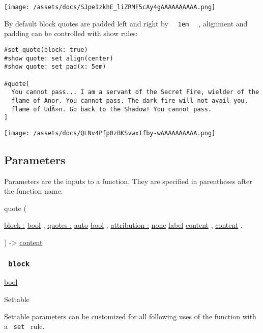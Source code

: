 \texttt{[image: /assets/docs/SJpe1zkhE\_liZRMF5cAy4gAAAAAAAAAA.png]}

By default block quotes are padded left and right by
\texttt{\ }{\texttt{\ 1em\ }}\texttt{\ } , alignment and padding can be
controlled with show rules:

\begin{verbatim}
#set quote(block: true)
#show quote: set align(center)
#show quote: set pad(x: 5em)

#quote[
  You cannot pass... I am a servant of the Secret Fire, wielder of the
  flame of Anor. You cannot pass. The dark fire will not avail you,
  flame of UdÃ»n. Go back to the Shadow! You cannot pass.
]
\end{verbatim}

\texttt{[image: /assets/docs/QLNv4Pfp0zBKSvwxIfby-wAAAAAAAAAA.png]}

\subsection{\texorpdfstring{{ Parameters
}}{ Parameters }}\label{parameters}

\label{parameters-tooltip}
Parameters are the inputs to a function. They are specified in
parentheses after the function name.

{ quote } (

{ \hyperref[parameters-block]{block :}
\href{/docs/reference/foundations/bool/}{bool} , } {
\hyperref[parameters-quotes]{quotes :}
\href{/docs/reference/foundations/auto/}{auto}
\href{/docs/reference/foundations/bool/}{bool} , } {
\hyperref[parameters-attribution]{attribution :}
\href{/docs/reference/foundations/none/}{none}
\href{/docs/reference/foundations/label/}{label}
\href{/docs/reference/foundations/content/}{content} , } {
\href{/docs/reference/foundations/content/}{content} , }

) -\textgreater{} \href{/docs/reference/foundations/content/}{content}

\subsubsection{\texorpdfstring{\texttt{\ block\ }}{ block }}\label{parameters-block}

\href{/docs/reference/foundations/bool/}{bool}

{{ Settable }}

\label{parameters-block-settable-tooltip}
Settable parameters can be customized for all following uses of the
function with a \texttt{\ set\ } rule.

